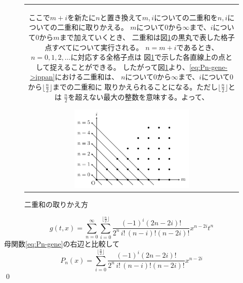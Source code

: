\documentclass[../main/main]{subfiles}
\begin{document}
\vspace{-12pt}
\begin{figure}[H]
  \begin{tabular}{c}
 \begin{minipage}{0.54\hsize}\small
ここで$m+i$を新たに$n$と置き換えて$m, i$についての二重和を$n, i$についての二重和に取りかえる。
$m$について$0$から$\infty$まで、$i$について$0$から$m$まで加えていくとき、
二重和は図\ref{fig:legendre}の黒丸で表した格子点すべてについて実行される。
$n=m+i$であるとき、$n=0, 1, 2, \dots$に対応する全格子点は
図\ref{fig:legendre}で示した各直線上の点として捉えることができる。
したがって図\ref{fig:legendre}より、\eqref{eq:Pn-gene->ippan}における二重和は、
$n$について$0$から$\infty$まで、$i$について$0$から$\lfloor \frac{n}{2} \rfloor$までの二重和に
取りかえられることになる。ただし$\lfloor \frac{n}{2} \rfloor$とは
$\frac{n}{2}$を超えない最大の整数を意味する。よって、
 \end{minipage}
  
  \begin{minipage}{0.04\hsize}
    \hspace{0pt}
  \end{minipage}

 \begin{minipage}{0.42\hsize}
    \centering
    \includegraphics[width=60mm]{../TikZ/legendre/legendre.pdf}
    \caption{二重和の取りかえ方}
    \label{fig:legendre}
 \end{minipage}
  \end{tabular}
\end{figure}

\vspace{-12pt}
\begin{equation*}
  g(t, x) 
	= \sum_{n=0}^\infty \sum_{i=0}^{\lfloor \frac{n}{2} \rfloor} 
		\frac{(-1)^i (2n-2i)!}{2^{n} \, i! \, (n-i)! (n-2i)!} x^{n-2i} t^{n}
\end{equation*}
母関数\eqref{eq:Pn-gene}の右辺と比較して
\begin{equation*}
  P_n(x) = \sum_{i=0}^{\lfloor \frac{n}{2} \rfloor} \frac{(-1)^i (2n-2i)!}{2^n\,  i!\, (n-i)! (n-2i)! }x^{n-2i}
\end{equation*}\qed
\end{document}
